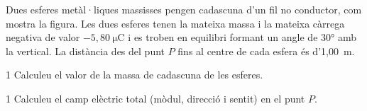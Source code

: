 Dues esferes metàl·liques massisses pengen cadascuna d'un fil no conductor, com mostra la figura. Les dues esferes tenen la mateixa massa i la mateixa càrrega negativa de valor $-5,80\ \mathrm{\mu C}$ i es troben en equilibri formant un angle de 30° amb la vertical. La distància des del punt $P$ fins al centre de cada esfera és d'1,00~m.


\begin{apartat}{1}
Calculeu el valor de la massa de cadascuna de les esferes.
\end{apartat}

\begin{apartat}{1}
Calculeu el camp elèctric total (mòdul, direcció i sentit) en el punt $P$.
\end{apartat}

